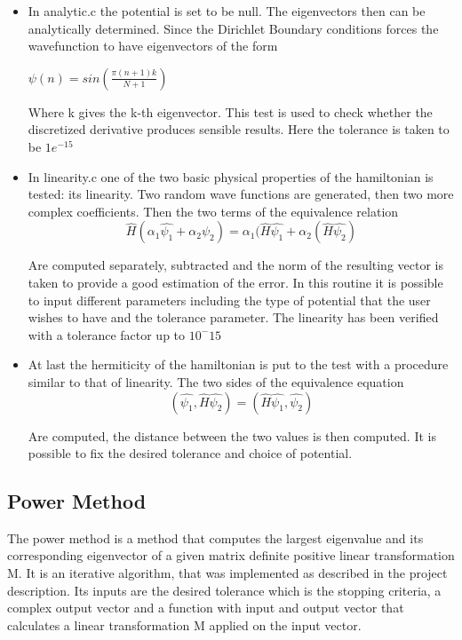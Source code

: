 \documentclass{article}
\begin{document}
\begin{itemize}
    \item In {\selectfont analytic.c} the potential is set to be null. The eigenvectors then can be analytically determined. Since the Dirichlet Boundary conditions forces the wavefunction to have eigenvectors of the form
    
    
    
    $\psi(n) = sin(\frac{\pi(n+1)k}{N+1})$
    
    
    Where k gives the k-th eigenvector.
    This test is used to check whether the discretized derivative produces sensible results. Here the tolerance is taken to be $1e^{-15}$
    
    \item In {\selectfont linearity.c} one of the two basic physical properties of the hamiltonian is tested: its linearity. 
    Two random wave functions are generated, then two more complex coefficients.
    Then the two terms of the equivalence relation
    $$
    \hat{H}(\alpha_1\hat{\psi_1} + \alpha_2\psi_2)  = \alpha_1(\hat{H}\hat{\psi_1} + \alpha_2(\hat{H}\hat{\psi_2})
    $$
    
    Are computed separately, subtracted and the norm of the resulting vector is taken to provide a good estimation of the error. In this routine it is possible to input different parameters including the type of potential that the user wishes to have and the tolerance parameter. The linearity has been verified with a tolerance factor up to $10^-15$
    
    \item At last the hermiticity of the hamiltonian is put to the test with a procedure similar to that of linearity.
    The two sides of the equivalence equation 
    $$ (\hat{\psi_1}, \hat{H}\hat{\psi_2}) = (\hat{H}\hat{\psi_1},\hat{\psi_2})$$
    
    Are computed, the distance between the two values is then computed. It is possible to fix the desired tolerance and choice of potential.
    
\end{itemize}

\subsection{Power Method}\label{pwr mthd}
The power method is a method that computes the largest eigenvalue and its corresponding eigenvector of a given matrix definite positive linear transformation M. 
It is an iterative algorithm, that was implemented as described in the project description.
Its inputs are the desired tolerance which is the stopping criteria, a complex output vector and a function with input and output vector that calculates a linear transformation M applied on the input vector.
\end{document}
